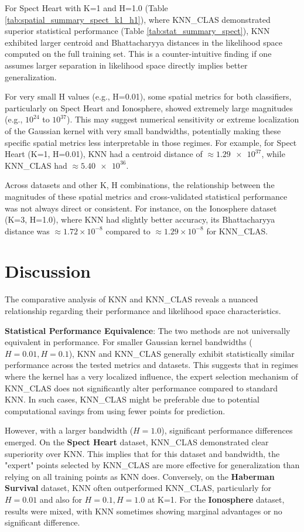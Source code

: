 \documentclass[conference]{IEEEtran}
\begin{document}
For Spect Heart with K=1 and H=1.0 (Table \ref{tab:spatial_summary_spect_k1_h1}), where KNN\_CLAS demonstrated superior statistical performance (Table \ref{tab:stat_summary_spect}), KNN exhibited larger centroid and Bhattacharyya distances in the likelihood space computed on the full training set. This is a counter-intuitive finding if one assumes larger separation in likelihood space directly implies better generalization.

For very small H values (e.g., H=0.01), some spatial metrics for both classifiers, particularly on Spect Heart and Ionosphere, showed extremely large magnitudes (e.g., $10^{24}$ to $10^{37}$). This may suggest numerical sensitivity or extreme localization of the Gaussian kernel with very small bandwidths, potentially making these specific spatial metrics less interpretable in those regimes. For example, for Spect Heart (K=1, H=0.01), KNN had a centroid distance of $\approx \num{1.29e+37}$, while KNN\_CLAS had $\approx \num{5.40e+36}$.

Across datasets and other K, H combinations, the relationship between the magnitudes of these spatial metrics and cross-validated statistical performance was not always direct or consistent. For instance, on the Ionosphere dataset (K=3, H=1.0), where KNN had slightly better accuracy, its Bhattacharyya distance was $\approx 1.72 \times 10^{-8}$ compared to $\approx 1.29 \times 10^{-8}$ for KNN\_CLAS.

\section{Discussion}
The comparative analysis of KNN and KNN\_CLAS reveals a nuanced relationship regarding their performance and likelihood space characteristics.

\textbf{Statistical Performance Equivalence}:
The two methods are not universally equivalent in performance. For smaller Gaussian kernel bandwidths ($H=0.01, H=0.1$), KNN and KNN\_CLAS generally exhibit statistically similar performance across the tested metrics and datasets. This suggests that in regimes where the kernel has a very localized influence, the expert selection mechanism of KNN\_CLAS does not significantly alter performance compared to standard KNN. In such cases, KNN\_CLAS might be preferable due to potential computational savings from using fewer points for prediction.

However, with a larger bandwidth ($H=1.0$), significant performance differences emerged. On the \textbf{Spect Heart} dataset, KNN\_CLAS demonstrated clear superiority over KNN. This implies that for this dataset and bandwidth, the "expert" points selected by KNN\_CLAS are more effective for generalization than relying on all training points as KNN does. Conversely, on the \textbf{Haberman Survival} dataset, KNN often outperformed KNN\_CLAS, particularly for $H=0.01$ and also for $H=0.1, H=1.0$ at K=1. For the \textbf{Ionosphere} dataset, results were mixed, with KNN sometimes showing marginal advantages or no significant difference.
\end{document}
